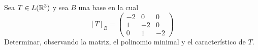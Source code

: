 \item Sea $T\in L(\mathbb{R}^3)$ y sea $B$ una base en la cual\[[T]_B=\begin{pmatrix}
        -2&0&0\\1&-2&0\\0&1&-2
    \end{pmatrix}\]
    Determinar, observando la matriz, el polinomio minimal y el característico de $T$.
    \begin{mdframed}[style=s]
        
    \end{mdframed}
